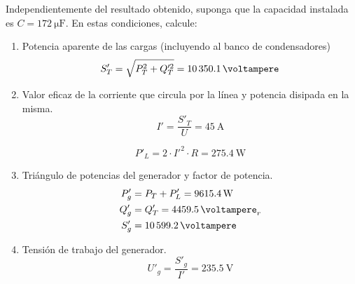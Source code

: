 \documentclass[12pt]{article}
\begin{document}
Independientemente del resultado obtenido, suponga que la capacidad instalada es $C = \SI{172}{\micro\farad}$. En estas condiciones, calcule:
\begin{enumerate}[resume]
\item Potencia aparente de las cargas (incluyendo al banco de condensadores)
\[
S'_T = \sqrt{P^2_T + Q'^2_T} = \SI{10350.1}{\voltampere}
\]

\item Valor eficaz de la corriente que circula por la línea y potencia disipada en la misma.
\[
I' = \frac{S'_T}{U} = \SI{45}{\ampere}
\]

\[
  P'_L = 2 \cdot I'^2 \cdot R = \SI{275.4}{\watt}
\]

\item Triángulo de potencias del generador y factor de potencia.
  \begin{align*}
    P'_g &= P_T + P'_L = \SI{9615.4}{\watt}\\
    Q'_g &= Q'_T = \SI{4459.5}{\voltampere}_r\\
    S'_g &= \SI{10599.2}{\voltampere}\\    
  \end{align*}

\item Tensión de trabajo del generador.
\[
U'_g = \frac{S'_g}{I'} = \SI{235.5}{\volt}
\]

\clearpage

\section{}








\end{enumerate}
\end{document}
